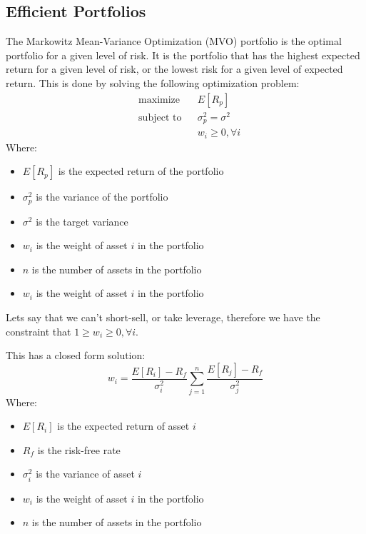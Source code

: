 \subsection{Efficient Portfolios}
The Markowitz Mean-Variance Optimization (MVO) portfolio is the optimal portfolio for a given level of risk. 
It is the portfolio that has the highest expected return for a given level of risk, or the lowest risk for a given level of expected return.
This is done by solving the following optimization problem:
\begin{equation}
    \label{eq:mvo_optimization}
    \begin{aligned}
        & \text{maximize} && E[R_p] \\
        & \text{subject to} && \sigma_p^2 = \sigma^2 \\
        & && w_i \geq 0, \forall i
    \end{aligned}
\end{equation}
Where:
\begin{itemize}
    \item $E[R_p]$ is the expected return of the portfolio
    \item $\sigma_p^2$ is the variance of the portfolio
    \item $\sigma^2$ is the target variance
    \item $w_i$ is the weight of asset $i$ in the portfolio
    \item $n$ is the number of assets in the portfolio
    \item $w_i$ is the weight of asset $i$ in the portfolio
\end{itemize}

Lets say that we can't short-sell, or take leverage, therefore we have the constraint that $1 \geq w_i \geq 0, \forall i$.

This has a closed form solution:
\begin{equation}
    \label{eq:mvo_closed_form}
    w_i = \frac{E[R_i] - R_f}{\sigma_i^2} \sum_{j=1}^n \frac{E[R_j] - R_f}{\sigma_j^2}
\end{equation}
Where:
\begin{itemize}
    \item $E[R_i]$ is the expected return of asset $i$
    \item $R_f$ is the risk-free rate
    \item $\sigma_i^2$ is the variance of asset $i$
    \item $w_i$ is the weight of asset $i$ in the portfolio
    \item $n$ is the number of assets in the portfolio
\end{itemize}

